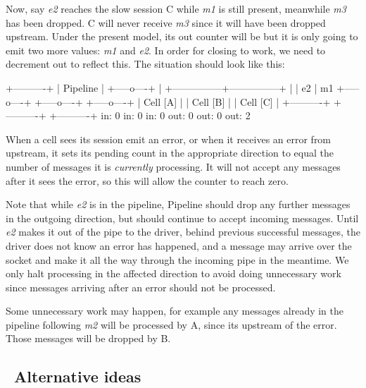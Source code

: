 Now, say {\itshape e2} reaches the slow session {\ttfamily C} while {\itshape m1} is still present, meanwhile {\itshape m3} has been dropped. {\ttfamily C} will never receive {\itshape m3} since it will have been dropped upstream. Under the present model, its {\ttfamily out} counter will be {} but it is only going to emit two more values\+: {\itshape m1} and {\itshape e2}. In order for closing to work, we need to decrement {\ttfamily out} to reflect this. The situation should look like this\+:

\begin{DoxyVerb}                          +----------+
                          | Pipeline |
                          +-----o----+
                                |
                +---------------+---------------+
                |               |           e2  | m1
          +-----o----+    +-----o----+    +-----o----+
          | Cell [A] |    | Cell [B] |    | Cell [C] |
          +----------+    +----------+    +----------+
             in: 0           in: 0           in: 0
            out: 0          out: 0          out: 2
\end{DoxyVerb}


When a cell sees its session emit an error, or when it receives an error from upstream, it sets its pending count in the appropriate direction to equal the number of messages it is {\itshape currently} processing. It will not accept any messages after it sees the error, so this will allow the counter to reach zero.

Note that while {\itshape e2} is in the pipeline, {\ttfamily Pipeline} should drop any further messages in the outgoing direction, but should continue to accept incoming messages. Until {\itshape e2} makes it out of the pipe to the driver, behind previous successful messages, the driver does not know an error has happened, and a message may arrive over the socket and make it all the way through the incoming pipe in the meantime. We only halt processing in the affected direction to avoid doing unnecessary work since messages arriving after an error should not be processed.

Some unnecessary work may happen, for example any messages already in the pipeline following {\itshape m2} will be processed by {\ttfamily A}, since it\textquotesingle{}s upstream of the error. Those messages will be dropped by {\ttfamily B}.

\subsection*{ \+Alternative ideas}

